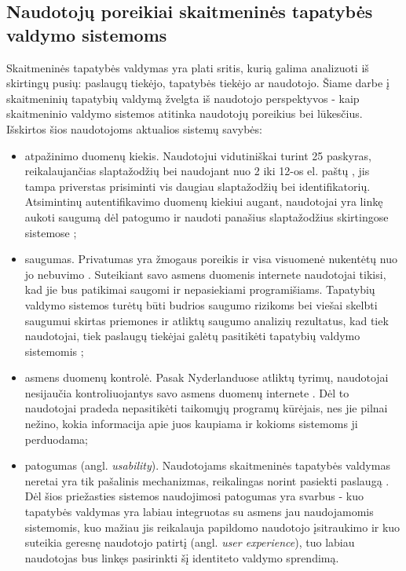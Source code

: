 \subsection{Naudotojų poreikiai skaitmeninės tapatybės valdymo sistemoms} \label{section:IDMUserNeeds}

Skaitmeninės tapatybės valdymas yra plati sritis, kurią galima analizuoti iš skirtingų pusių: paslaugų tiekėjo, tapatybės tiekėjo ar naudotojo.
Šiame darbe į skaitmeninių tapatybių valdymą žvelgta iš naudotojo perspektyvos - kaip skaitmeninio valdymo sistemos atitinka naudotojų poreikius
bei lūkesčius. Išskirtos šios naudotojoms aktualios sistemų savybės:

\begin{itemize}
    \item atpažinimo duomenų kiekis. Naudotojui vidutiniškai turint 25 paskyras, reikalaujančias slaptažodžių \cite{Florencio2007} bei naudojant
    nuo 2 iki 12-os el. paštų \cite{Gross2007}, jis tampa priverstas prisiminti vis daugiau slaptažodžių bei identifikatorių. Atsimintinų autentifikavimo duomenų kiekiui
    augant, naudotojai yra linkę aukoti saugumą dėl patogumo ir naudoti panašius
    slaptažodžius skirtingose sistemose \cite{Pashalidis2003, Samar1999};
    \item saugumas. Privatumas yra žmogaus poreikis ir visa visuomenė nukentėtų nuo jo nebuvimo \cite{Maliki2007}.
    Suteikiant savo asmens duomenis internete naudotojai tikisi, kad jie bus patikimai
    saugomi ir nepasiekiami programišiams. Tapatybių valdymo sistemos turėtų būti budrios saugumo rizikoms bei viešai skelbti
    saugumui skirtas priemones ir atliktų saugumo analizių rezultatus, kad tiek naudotojai, tiek paslaugų tiekėjai
    galėtų pasitikėti tapatybių valdymo sistemomis \cite{Dhamija2008};
    \item asmens duomenų kontrolė. Pasak Nyderlanduose atliktų tyrimų, naudotojai nesijaučia kontroliuojantys savo asmens duomenų internete \cite{Baars2016}. Dėl to
    naudotojai pradeda nepasitikėti taikomųjų programų kūrėjais, nes jie pilnai nežino, kokia informacija apie juos kaupiama ir kokioms
    sistemoms ji perduodama;
    \item patogumas (angl. \textit{usability}). Naudotojams skaitmeninės tapatybės valdymas neretai yra tik pašalinis mechanizmas, reikalingas
    norint pasiekti paslaugą \cite{Dhamija2008}. Dėl šios priežasties sistemos naudojimosi patogumas yra svarbus - kuo tapatybės valdymas yra labiau integruotas
    su asmens jau naudojamomis sistemomis, kuo mažiau jis reikalauja papildomo naudotojo įsitraukimo ir kuo suteikia geresnę naudotojo patirtį (angl. \textit{user experience}), tuo labiau naudotojas bus linkęs pasirinkti šį identiteto valdymo sprendimą.
\end{itemize}

